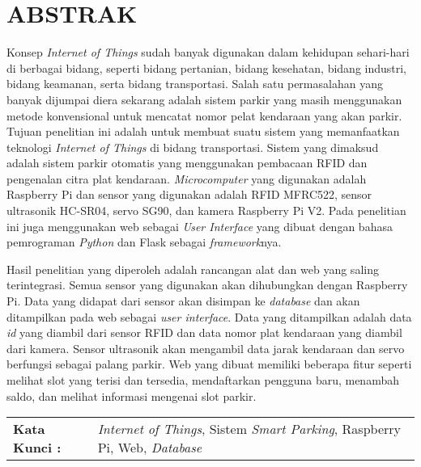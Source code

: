 \chapter*{ABSTRAK}

Konsep \textit{Internet of Things} sudah banyak digunakan dalam kehidupan sehari-hari di berbagai bidang, seperti bidang pertanian, bidang kesehatan, bidang industri, bidang keamanan, serta bidang transportasi. Salah satu permasalahan yang banyak dijumpai diera sekarang adalah sistem parkir yang masih menggunakan metode konvensional untuk mencatat nomor pelat kendaraan yang akan parkir. Tujuan penelitian ini adalah untuk membuat suatu sistem yang memanfaatkan teknologi \textit{Internet of Things} di bidang transportasi. Sistem yang dimaksud adalah sistem parkir otomatis yang menggunakan pembacaan RFID dan pengenalan citra plat kendaraan. \textit{Microcomputer} yang digunakan adalah Raspberry Pi dan sensor yang digunakan adalah RFID MFRC522, sensor ultrasonik HC-SR04, servo SG90, dan kamera Raspberry Pi V2. Pada penelitian ini juga menggunakan web sebagai \textit{User Interface} yang dibuat dengan bahasa pemrograman \textit{Python} dan Flask sebagai \textit{framework}nya.

Hasil penelitian yang diperoleh adalah rancangan alat dan web yang saling terintegrasi. Semua sensor yang digunakan akan dihubungkan dengan Raspberry Pi. Data yang didapat dari sensor akan disimpan ke \textit{database} dan akan ditampilkan pada web sebagai \textit{user interface}. Data yang ditampilkan adalah data \textit{id} yang diambil dari sensor RFID dan data nomor plat kendaraan yang diambil dari kamera. Sensor ultrasonik akan mengambil data jarak kendaraan dan servo berfungsi sebagai palang parkir. Web yang dibuat memiliki beberapa fitur seperti melihat slot yang terisi dan tersedia, mendaftarkan pengguna baru, menambah saldo, dan melihat informasi mengenai slot parkir.

\begin{table}[h]
    \begin{tabular}{ p{} p{} }
        \\
        \textbf{Kata Kunci :} & \textit{Internet of Things}, Sistem \textit{Smart Parking}, Raspberry Pi, Web, \textit{Database}
    \end{tabular}
\end{table}